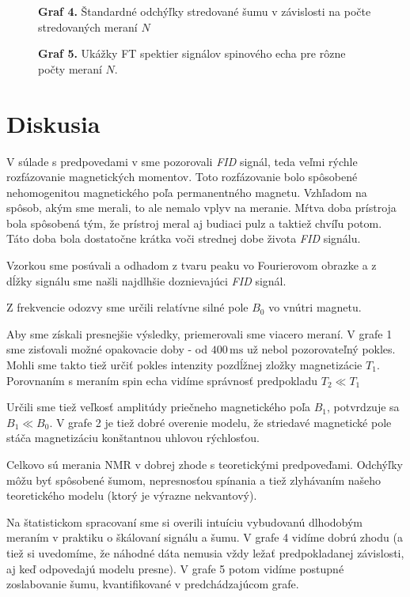 \documentclass[a4paper, 10pt]{article}
\newcommand{\unit}[1]{\ensuremath{\, \mathrm{#1}}}
\begin{document}
\begin{figure}[!ht]
\centering
\vspace*{-15pt}

\textbf{Graf 4.} Štandardné odchýľky stredované šumu v závislosti na počte stredovaných meraní $N$
\end{figure}

\begin{figure}[]
\centering

\textbf{Graf 5.} Ukážky FT spektier signálov spinového echa pre rôzne počty meraní $N$.
\end{figure}
\section*{Diskusia}
V súlade s predpovedami v \cite{stud} sme pozorovali \textit{FID} signál, teda veľmi rýchle rozfázovanie magnetických momentov. Toto rozfázovanie bolo spôsobené nehomogenitou magnetického poľa permanentného magnetu. Vzhľadom na spôsob, akým sme merali, to ale nemalo vplyv na meranie. Mŕtva doba prístroja bola spôsobená tým, že prístroj meral aj budiaci pulz a taktiež chvíľu potom. Táto doba bola dostatočne krátka voči strednej dobe života \textit{FID} signálu. 

Vzorkou sme posúvali a odhadom z tvaru peaku vo Fourierovom obrazke a z dĺžky signálu sme našli najdlhšie doznievajúci \textit{FID} signál. 

Z frekvencie odozvy sme určili relatívne silné pole $B_0$ vo vnútri magnetu.

Aby sme získali presnejšie výsledky, priemerovali sme viacero meraní. V grafe 1 sme zisťovali možné opakovacie doby - od $400\unit{ms}$ už nebol pozorovateľný pokles. Mohli sme takto tiež určiť pokles intenzity pozdĺžnej zložky magnetizácie $T_1$. Porovnaním s meraním spin echa vidíme správnosť predpokladu $T_2\ll T_1$

Určili sme tiež veľkosť amplitúdy priečneho magnetického poľa $B_1$, potvrdzuje sa $B_1\ll B_0$. V grafe 2 je tiež dobré overenie modelu, že striedavé magnetické pole stáča magnetizáciu konštantnou uhlovou rýchlosťou.

Celkovo sú merania NMR v dobrej zhode s teoretickými predpoveďami. Odchýľky môžu byť spôsobené šumom, nepresnosťou spínania a tiež zlyhávaním našeho teoretického modelu (ktorý je výrazne nekvantový). 

Na štatistickom spracovaní sme si overili intuíciu vybudovanú dlhodobým meraním v praktiku o škálovaní signálu a šumu. V grafe 4 vidíme dobrú zhodu (a tiež si uvedomíme, že náhodné dáta nemusia vždy ležať predpokladanej závislosti, aj keď odpovedajú modelu presne). V grafe 5 potom vidíme postupné zoslabovanie šumu, kvantifikované v predchádzajúcom grafe. 
\end{document}
